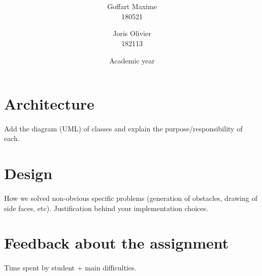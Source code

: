\documentclass[a4paper, 11pt, oneside]{article}
\title{\ClassName\\\vspace*{0.8cm}\ProjectName\vspace{0.8cm}}
\author{Goffart Maxime \\180521 \and Joris Olivier \\ 182113}
\date{\vspace{1cm}Academic year \AcademicYear}
\begin{document}
\begin{titlingpage}
{\let\newpage\relax\maketitle}
\end{titlingpage}


\section{Architecture}
\paragraph{}Add the diagram (UML) of classes and explain the purpose/responsibility of each.


\section{Design}
\paragraph{}How we solved non-obvious specific problems (generation of obstacles, drawing of side faces, etc). Justification behind your implementation choices.


\section{Feedback about the assignment}
\paragraph{}Time spent by student + main difficulties.

\end{document}
